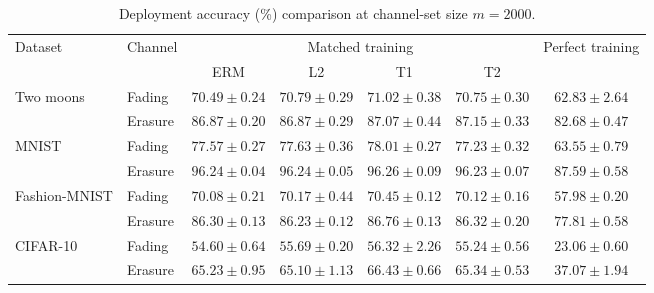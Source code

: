 \begin{table}[htb]
\centering
\caption{Deployment accuracy (\%) comparison at channel-set size $m=2000$.}
\label{tab:performance}
\begin{tabular*}{\linewidth}{@{\extracolsep{\fill}}llccccc@{}}
\toprule
\multirow{2}{*}{Dataset} & \multirow{2}{*}{Channel}
& \multicolumn{4}{c}{Matched training} & \multirow{2}{*}{Perfect training} \\
\cmidrule(lr){3-6}
& & ERM & L2 & T1 & T2 &  \\
\midrule
\multirow{2}{*}{Two moons}
& Fading
& $70.49\pm0.24$ & $70.79\pm0.29$ & $\mathbf{71.02}\pm0.38$ & $70.75\pm0.30$ & $62.83\pm2.64$ \\
& Erasure
& $86.87\pm0.20$ & $86.87\pm0.29$ & $87.07\pm0.44$ & $\mathbf{87.15}\pm0.33$ & $82.68\pm0.47$ \\
\midrule
\multirow{2}{*}{MNIST}
& Fading
& $77.57\pm0.27$ & $77.63\pm0.36$ & $\mathbf{78.01}\pm0.27$ & $77.23\pm0.32$ & $63.55\pm0.79$ \\
& Erasure
& $96.24\pm0.04$ & $96.24\pm0.05$ & $\mathbf{96.26}\pm0.09$ & $96.23\pm0.07$ & $87.59\pm0.58$ \\
\midrule
\multirow{2}{*}{Fashion-MNIST}
& Fading
& $70.08\pm0.21$ & $70.17\pm0.44$ & $\mathbf{70.45}\pm0.12$ & $70.12\pm0.16$ & $57.98\pm0.20$ \\
& Erasure
& $86.30\pm0.13$ & $86.23\pm0.12$ & $\mathbf{86.76}\pm0.13$ & $86.32\pm0.20$ & $77.81\pm0.58$ \\
\midrule
\multirow{2}{*}{CIFAR-10}
& Fading
& $54.60\pm0.64$ & $55.69\pm0.20$ & $\mathbf{56.32}\pm2.26$ & $55.24\pm0.56$ & $23.06\pm0.60$ \\
& Erasure
& $65.23\pm0.95$ & $65.10\pm1.13$ & $\mathbf{66.43}\pm0.66$ & $65.34\pm0.53$ & $37.07\pm1.94$ \\
\bottomrule
\end{tabular*}
\end{table}
